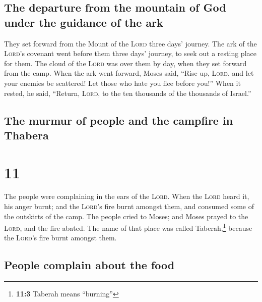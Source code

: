 \hypertarget{the-departure-from-the-mountain-of-god-under-the-guidance-of-the-ark}{%
\subsection{The departure from the mountain of God under the guidance of
the
ark}\label{the-departure-from-the-mountain-of-god-under-the-guidance-of-the-ark}}

 They set forward from the Mount of the \textsc{Lord}
three days' journey. The ark of the \textsc{Lord}'s covenant went before
them three days' journey, to seek out a resting place for them.
 The cloud of the \textsc{Lord} was over them by day,
when they set forward from the camp.  When the ark went
forward, Moses said, ``Rise up, \textsc{Lord}, and let your enemies be
scattered! Let those who hate you flee before you!'' 
When it rested, he said, ``Return, \textsc{Lord}, to the ten thousands
of the thousands of Israel.''

\hypertarget{the-murmur-of-people-and-the-campfire-in-thabera}{%
\subsection{The murmur of people and the campfire in
Thabera}\label{the-murmur-of-people-and-the-campfire-in-thabera}}

\hypertarget{section-10}{%
\section{11}\label{section-10}}

 The people were complaining in the ears of the
\textsc{Lord}. When the \textsc{Lord} heard it, his anger burnt; and the
\textsc{Lord}'s fire burnt amongst them, and consumed some of the
outskirts of the camp.  The people cried to Moses; and
Moses prayed to the \textsc{Lord}, and the fire abated. 
The name of that place was called Taberah,\footnote{\textbf{11:3}
  Taberah means ``burning''} because the \textsc{Lord}'s fire burnt
amongst them.

\hypertarget{people-complain-about-the-food}{%
\subsection{People complain about the
food}\label{people-complain-about-the-food}}

